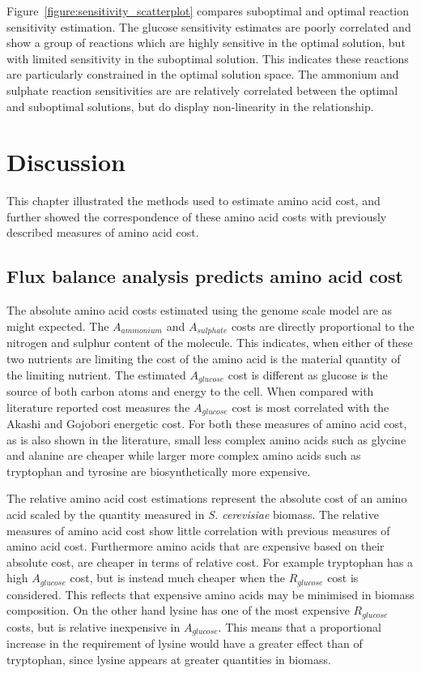Figure~\vref{figure:sensitivity_scatterplot} compares suboptimal and optimal reaction sensitivity estimation. The glucose sensitivity estimates are poorly correlated and show a group of reactions which are highly sensitive in the optimal solution, but with limited sensitivity in the suboptimal solution. This indicates these reactions are particularly constrained in the optimal solution space. The ammonium and sulphate reaction sensitivities are are relatively correlated between the optimal and suboptimal solutions, but do display non-linearity in the relationship.

\clearpage

\section{Discussion}%

This chapter illustrated the methods used to estimate amino acid cost, and further showed the correspondence of these amino acid costs with previously described measures of amino acid cost.

\subsection{Flux balance analysis predicts amino acid cost}

The absolute amino acid costs estimated using the genome scale model are as might expected. The $A_{ammonium}$ and $A_{sulphate}$ costs are directly proportional to the nitrogen and sulphur content of the molecule. This indicates, when either of these two nutrients are limiting the cost of the amino acid is the material quantity of the limiting nutrient. The estimated $A_{glucose}$ cost is different as glucose is the source of both carbon atoms and energy to the cell. When compared with literature reported cost measures the $A_{glucose}$ cost is most correlated with the Akashi and Gojobori energetic cost. For both these measures of amino acid cost, as is also shown in the literature, small less complex amino acids such as glycine and alanine are cheaper while larger more complex amino acids such as tryptophan and tyrosine are biosynthetically more expensive.

The relative amino acid cost estimations represent the absolute cost of an amino acid scaled by the quantity measured in \emph{S. cerevisiae} biomass. The relative measures of amino acid cost show little correlation with previous measures of amino acid cost. Furthermore amino acids that are expensive based on their absolute cost, are cheaper in terms of relative cost. For example tryptophan has a high $A_{glucose}$ cost, but is instead much cheaper when the $R_{glucose}$ cost is considered. This reflects that expensive amino acids may be minimised in biomass composition. On the other hand lysine has one of the most expensive $R_{glucose}$ costs, but is relative inexpensive in $A_{glucose}$. This means that a proportional increase in the requirement of lysine would have a greater effect than of tryptophan, since lysine appears at greater quantities in biomass.

